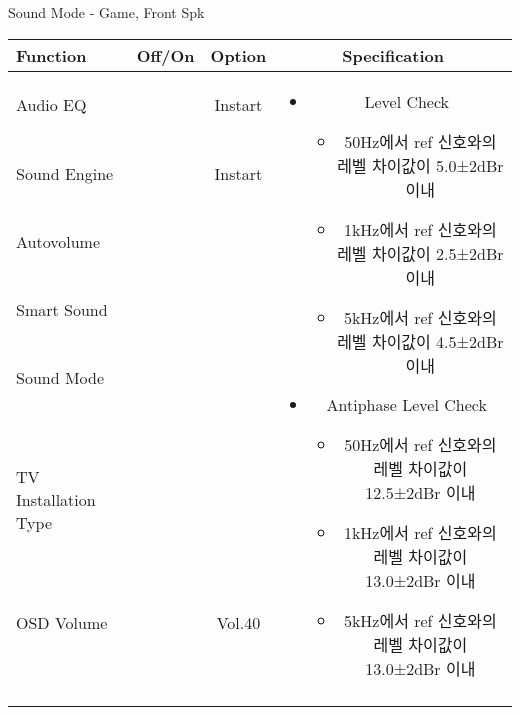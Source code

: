 \begin{frame}[t]{Sound Mode - Game, Front Spk}
\begin{tiny}
\begin{tabular}{@{}lccc@{}}
\toprule
Function & Off/On & Option & Specification \\
\midrule
Audio EQ & \color{black}{Off} & Instart &
\multirow{10}{60mm}{
\begin{itemize}
    \item Level Check
    \begin{itemize}
        \item 50Hz에서 ref 신호와의 레벨 차이값이 5.0±2dBr 이내
        \item 1kHz에서 ref 신호와의 레벨 차이값이 2.5±2dBr 이내
        \item 5kHz에서 ref 신호와의 레벨 차이값이 4.5±2dBr 이내
    \end{itemize}
    \item Antiphase Level Check
    \begin{itemize}
        \item 50Hz에서 ref 신호와의 레벨 차이값이 12.5±2dBr 이내
        \item 1kHz에서 ref 신호와의 레벨 차이값이 13.0±2dBr 이내
        \item 5kHz에서 ref 신호와의 레벨 차이값이 13.0±2dBr 이내
    \end{itemize}
\end{itemize}
} \\
Sound Engine & \color{blue}{On} & Instart & \\
Autovolume & \color{black}{Off} & & \\
Smart Sound & \color{black}{Off} & & \\
Sound Mode & \color{blue}{On} & \color{blue}{Game} & \\
TV Installation Type & \color{blue}{On} & \color{black}{Standtype1} & \\
OSD Volume & \color{blue}{On} & Vol.40 & \\
& & & \\
& & & \\
& & & \\
& & & \\
\midrule
\end{tabular}
\end{tiny}

\end{frame}


